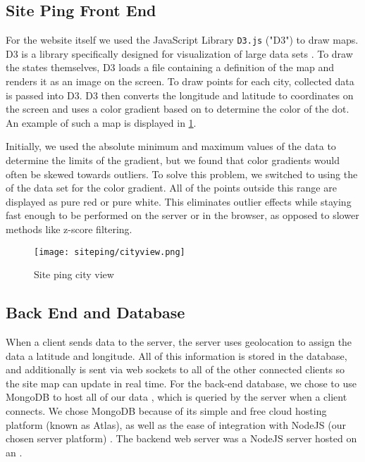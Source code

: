 \subsection{Site Ping Front End}

For the website itself we used the JavaScript Library \texttt{D3.js} ("D3") to draw maps. D3 is a library specifically designed for visualization of large data sets \cite{Bostock2011a}. To draw the states themselves, D3 loads a \json file containing a definition of the map and renders it as an \svg image on the screen. To draw points for each city, collected data is passed into D3. D3 then converts the longitude and latitude to coordinates on the screen and uses a color gradient based on \rtt to determine the color of the dot. An example of such a map is displayed in \cref{fig:siteping_city}.

Initially, we used the absolute minimum and maximum values of the data to determine the limits of the gradient, but we found that color gradients would often be skewed towards outliers. To solve this problem, we switched to using the \iqr of the data set for the color gradient. All of the points outside this range are displayed as pure red or pure white. This eliminates outlier effects while staying fast enough to be performed on the server or in the browser, as opposed to slower methods like z-score filtering.

\begin{figure}[h]
    \centering
    \texttt{[image: siteping/cityview.png]}
    \caption{Site ping city view}
    \label{fig:siteping_city}
\end{figure}

\subsection{Back End and Database}

When a client sends data to the server, the server uses  geolocation to assign the data a latitude and longitude. All of this information is stored in the database, and additionally is sent via web sockets to all of the other connected clients so the site map can update in real time. For the back-end database, we chose to use MongoDB to host all of our data \cite{MongoDB2019a}, which is queried by the server when a client connects. We chose MongoDB because of its simple and free cloud hosting platform (known as Atlas), as well as the ease of integration with NodeJS (our chosen server platform) \cite{OpenJSFoundation2019a}. The backend web server was a NodeJS server hosted on an \aws \ecc.

